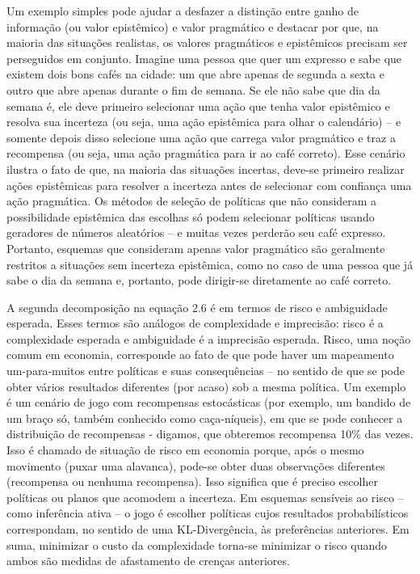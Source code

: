 \documentclass[
  12pt,
]{book}
\begin{document}
Um exemplo simples pode ajudar a desfazer a distinção entre ganho de informação (ou valor epistêmico) e valor pragmático e destacar por que, na maioria das situações realistas, os valores pragmáticos e epistêmicos precisam ser perseguidos em conjunto. Imagine uma pessoa que quer um expresso e sabe que existem dois bons cafés na cidade: um que abre apenas de segunda a sexta e outro que abre apenas durante o fim de semana. Se ele não sabe que dia da semana é, ele deve primeiro selecionar uma ação que tenha valor epistêmico e resolva sua incerteza (ou seja, uma ação epistêmica para olhar o calendário) -- e somente depois disso selecione uma ação que carrega valor pragmático e traz a recompensa (ou seja, uma ação pragmática para ir ao café correto). Esse cenário ilustra o fato de que, na maioria das situações incertas, deve-se primeiro realizar ações epistêmicas para resolver a incerteza antes de selecionar com confiança uma ação pragmática. Os métodos de seleção de políticas que não consideram a possibilidade epistêmica das escolhas só podem selecionar políticas usando geradores de números aleatórios -- e muitas vezes perderão seu café expresso. Portanto, esquemas que consideram apenas valor pragmático são geralmente restritos a situações sem incerteza epistêmica, como no caso de uma pessoa que já sabe o dia da semana e, portanto, pode dirigir-se diretamente ao café correto.

A segunda decomposição na equação 2.6 é em termos de risco e ambiguidade esperada. Esses termos são análogos de complexidade e imprecisão: risco é a complexidade esperada e ambiguidade é a imprecisão esperada. Risco, uma noção comum em economia, corresponde ao fato de que pode haver um mapeamento um-para-muitos entre políticas e suas consequências -- no sentido de que se pode obter vários resultados diferentes (por acaso) sob a mesma política. Um exemplo é um cenário de jogo com recompensas estocásticas (por exemplo, um bandido de um braço só, também conhecido como caça-níqueis), em que se pode conhecer a distribuição de recompensas - digamos, que obteremos recompensa 10\% das vezes. Isso é chamado de situação de risco em economia porque, após o mesmo movimento (puxar uma alavanca), pode-se obter duas observações diferentes (recompensa ou nenhuma recompensa). Isso significa que é preciso escolher políticas ou planos que acomodem a incerteza. Em esquemas sensíveis ao risco -- como inferência ativa -- o jogo é escolher políticas cujos resultados probabilísticos correspondam, no sentido de uma KL-Divergência, às preferências anteriores. Em suma, minimizar o custo da complexidade torna-se minimizar o risco quando ambos são medidas de afastamento de crenças anteriores.
\end{document}
